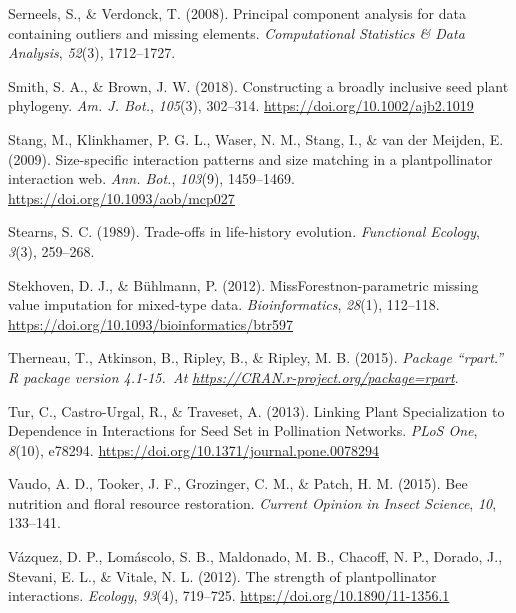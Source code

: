 \documentclass[
  12pt,
  a4paper,
]{article}
\newlength{\cslhangindent}
\newlength{\cslentryspacingunit} %
\newenvironment{CSLReferences}[2] %
 {%
  \setlength{\parindent}{0pt}
  \ifodd #1
  \let\oldpar\par
  \def\par{\hangindent=\cslhangindent\oldpar}
  \fi
  \setlength{\parskip}{#2\cslentryspacingunit}
 }%
 {}
\begin{document}
\begin{CSLReferences}{1}{0}
\leavevmode{}%
Serneels, S., \& Verdonck, T. (2008). Principal component analysis for data containing outliers and missing elements. \emph{Computational Statistics \& Data Analysis}, \emph{52}(3), 1712--1727.

\leavevmode{}%
Smith, S. A., \& Brown, J. W. (2018). Constructing a broadly inclusive seed plant phylogeny. \emph{Am. J. Bot.}, \emph{105}(3), 302--314. \url{https://doi.org/10.1002/ajb2.1019}

\leavevmode{}%
Stang, M., Klinkhamer, P. G. L., Waser, N. M., Stang, I., \& van der Meijden, E. (2009). Size-specific interaction patterns and size matching in a plant\textendash pollinator interaction web. \emph{Ann. Bot.}, \emph{103}(9), 1459--1469. \url{https://doi.org/10.1093/aob/mcp027}

\leavevmode{}%
Stearns, S. C. (1989). Trade-offs in life-history evolution. \emph{Functional Ecology}, \emph{3}(3), 259--268.

\leavevmode{}%
Stekhoven, D. J., \& Bühlmann, P. (2012). {MissForest}\textemdash non-parametric missing value imputation for mixed-type data. \emph{Bioinformatics}, \emph{28}(1), 112--118. \url{https://doi.org/10.1093/bioinformatics/btr597}

\leavevmode{}%
Therneau, T., Atkinson, B., Ripley, B., \& Ripley, M. B. (2015). \emph{Package {``rpart.''} R package version 4.1-15.~At \href{https://CRAN.R-project.org/package=rpart}{https://CRAN.r-project.org/package=rpart}}.

\leavevmode{}%
Tur, C., Castro-Urgal, R., \& Traveset, A. (2013). Linking {Plant Specialization} to {Dependence} in {Interactions} for {Seed Set} in {Pollination Networks}. \emph{PLoS One}, \emph{8}(10), e78294. \url{https://doi.org/10.1371/journal.pone.0078294}

\leavevmode{}%
Vaudo, A. D., Tooker, J. F., Grozinger, C. M., \& Patch, H. M. (2015). Bee nutrition and floral resource restoration. \emph{Current Opinion in Insect Science}, \emph{10}, 133--141.

\leavevmode{}%
Vázquez, D. P., Lomáscolo, S. B., Maldonado, M. B., Chacoff, N. P., Dorado, J., Stevani, E. L., \& Vitale, N. L. (2012). The strength of plant\textendash pollinator interactions. \emph{Ecology}, \emph{93}(4), 719--725. \url{https://doi.org/10.1890/11-1356.1}


\end{CSLReferences}
\end{document}

